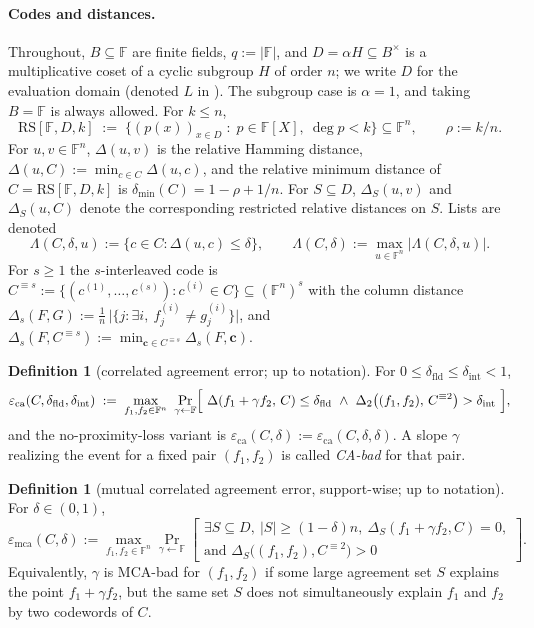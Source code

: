 \documentclass[11pt]{article}
\theoremstyle{definition}
\newtheorem{definition}[theorem]{Definition}
\theoremstyle{remark}
\newcommand{\F}{\mathbb{F}}
\newcommand{\B}{B}
\newcommand{\RS}{\mathrm{RS}}
\newcommand{\eca}{\varepsilon_{\mathrm{ca}}}
\newcommand{\emca}{\varepsilon_{\mathrm{mca}}}
\newcommand{\dmin}{\delta_{\min}}
\newcommand{\dist}{\Delta}
\newcommand{\distS}{\Delta_S}
\newcommand{\Lst}{\Lambda}
\begin{document}
\paragraph{Codes and distances.} Throughout, $\B\subseteq\F$ are finite fields, $q:=|\F|$, and $D=\alpha H\subseteq\B^\times$ is a multiplicative coset of a cyclic subgroup $H$ of order $n$; we write $D$ for the evaluation domain (denoted $L$ in \cite{ABF26}). The subgroup case is $\alpha=1$, and taking $\B=\F$ is always allowed. For $k\le n$,
\[
\RS[\F,D,k]\;:=\;\bigl\{(p(x))_{x\in D}\;:\;p\in\F[X],\ \deg p<k\bigr\}\subseteq\F^n,
\qquad \rho:=k/n .
\]
For $u,v\in\F^n$, $\dist(u,v)$ is the relative Hamming distance, $\dist(u,C):=\min_{c\in C}\dist(u,c)$, and the relative minimum distance of $C=\RS[\F,D,k]$ is $\dmin(C)=1-\rho+1/n$. For $S\subseteq D$, $\distS(u,v)$ and $\distS(u,C)$ denote the corresponding restricted relative distances on $S$. Lists are denoted
\[
\Lst(C,\delta,u):=\{c\in C:\dist(u,c)\le\delta\},\qquad \Lst(C,\delta):=\max_{u\in\F^n}|\Lst(C,\delta,u)| .
\]
For $s\ge1$ the $s$-interleaved code is $C^{\equiv s}:=\{(c^{(1)},\dots,c^{(s)}):c^{(i)}\in C\}\subseteq(\F^n)^s$ with the column distance $\dist_s(F,G):=\frac1n\,\bigl|\{j:\exists i,\ f^{(i)}_j\ne g^{(i)}_j\}\bigr|$, and $\dist_s(F,C^{\equiv s}):=\min_{\mathbf c\in C^{\equiv s}}\dist_s(F,\mathbf c)$.

\begin{definition}[correlated agreement error; {\cite[Def.~4.1]{ABF26}} up to notation]\label{def:ca}
For $0\le\delta_{\mathrm{fld}}\le\delta_{\mathrm{int}}<1$,
\[
\eca(C,\delta_{\mathrm{fld}},\delta_{\mathrm{int}})\;:=\;\max_{f_1,f_2\in\F^n}\ \Pr_{\gamma\leftarrow\F}\Bigl[\ \dist(f_1+\gamma f_2,\,C)\le\delta_{\mathrm{fld}}\ \wedge\ \dist_2\bigl((f_1,f_2),\,C^{\equiv2}\bigr)>\delta_{\mathrm{int}}\ \Bigr],
\]
and the no-proximity-loss variant is $\eca(C,\delta):=\eca(C,\delta,\delta)$. A slope $\gamma$ realizing the event for a fixed pair $(f_1,f_2)$ is called \emph{CA-bad} for that pair.
\end{definition}

\begin{definition}[mutual correlated agreement error, support-wise; {\cite[Def.~4.3]{ABF26}} up to notation]\label{def:mca}
For $\delta\in(0,1)$,
\[
\emca(C,\delta):=\max_{f_1,f_2\in\F^n}\Pr_{\gamma\leftarrow\F}\left[
\begin{array}{l}
\exists S\subseteq D,\ |S|\ge(1-\delta)n,\ \distS(f_1+\gamma f_2,C)=0,\\[2pt]
\text{and }\distS\bigl((f_1,f_2),C^{\equiv2}\bigr)>0
\end{array}
\right].
\]
Equivalently, $\gamma$ is MCA-bad for $(f_1,f_2)$ if some large agreement set $S$ explains the point $f_1+\gamma f_2$, but the same set $S$ does not simultaneously explain $f_1$ and $f_2$ by two codewords of $C$.
\end{definition}
\end{document}
